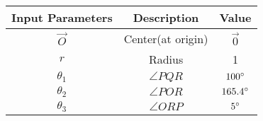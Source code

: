 \begin{tabular}{|c|c|c|}
    \hline
    \textbf{Input Parameters} &\textbf{Description} &\textbf{Value} \\
    \hline
     $\vec{O}$& Center(at origin)&$\vec{0}$\\
     \hline
 $r$ & Radius &1\\
 \hline
 $\theta_1$&$\angle PQR$&$100\degree$\\
 \hline
 $\theta_2$&$\angle POR $&$165.4\degree$\\
 \hline
 $\theta_3$&$\angle ORP $&$5\degree$\\
 \hline
  \end{tabular}


